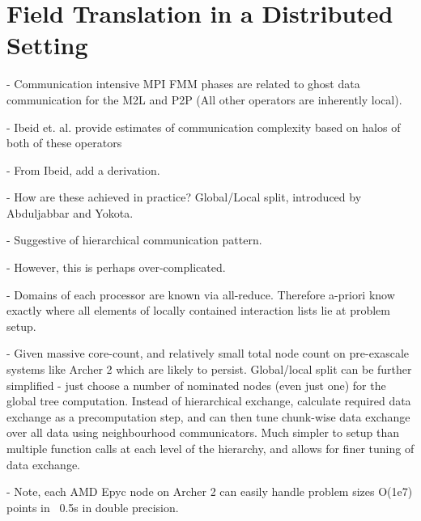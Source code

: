 \section{Field Translation in a Distributed Setting}

- Communication intensive MPI FMM phases are related to ghost data communication for the M2L and P2P (All other operators are inherently local).

- Ibeid et. al. provide estimates of communication complexity based on halos of both of these operators

- From Ibeid, add a derivation.

- How are these achieved in practice? Global/Local split, introduced by Abduljabbar and Yokota.

- Suggestive of hierarchical communication pattern.

- However, this is perhaps over-complicated.

- Domains of each processor are known via all-reduce. Therefore a-priori know exactly where all elements of locally contained interaction lists lie at problem setup.

- Given massive core-count, and relatively small total node count on pre-exascale systems like Archer 2 which are likely to persist. Global/local split can be further simplified - just choose a number of nominated nodes (even just one) for the global tree computation. Instead of hierarchical exchange, calculate required data exchange as a precomputation step, and can then tune chunk-wise data exchange over all data using neighbourhood communicators. Much simpler to setup than multiple function calls at each level of the hierarchy, and allows for finer tuning of data exchange.

- Note, each AMD Epyc node on Archer 2 can easily handle problem sizes O(1e7) points in ~0.5s in double precision.

